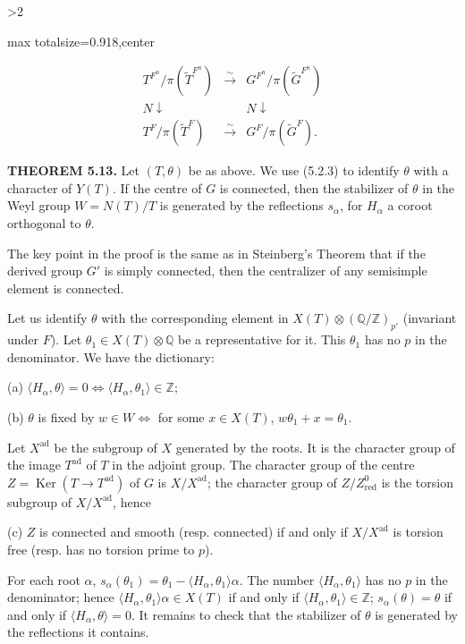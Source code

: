 \documentclass[9pt,twoside]{extarticle}
\newcommand{\EditionPage}[3]{%
  \ifnum#1>2\clearpage\fi
  \pdfbookmark[1]{Printed page #2}{en-folio-#2}%
  \hypertarget{en-physical-#1}{}%
  \noindent\begin{adjustbox}{max totalsize={\textwidth}{0.918\textheight},center}
  \begin{minipage}[t]{\textwidth}
  \fontsize{9.4}{11.1}\selectfont\justifying
  #3
  \end{minipage}
  \end{adjustbox}%
}
\begin{document}
\EditionPage{30}{131}{%
\[
\begin{array}{ccc}
T^{F^n}/\pi(\widetilde T^{F^n})&\xrightarrow{\sim}&G^{F^n}/\pi(\widetilde G^{F^n})\\
{\scriptstyle N}\downarrow&&{\scriptstyle N}\downarrow\\
T^F/\pi(\widetilde T^F)&\xrightarrow{\sim}&G^F/\pi(\widetilde G^F).
\end{array}
\]

\noindent\textbf{THEOREM 5.13.} Let \((T,\theta)\) be as above. We use (5.2.3) to identify \(\theta\) with a character of \(Y(T)\). If the centre of \(G\) is connected, then the stabilizer of \(\theta\) in the Weyl group \(W=N(T)/T\) is generated by the reflections \(s_\alpha\), for \(H_\alpha\) a coroot orthogonal to \(\theta\).\par

The key point in the proof is the same as in Steinberg's Theorem that if the derived group \(G'\) is simply connected, then the centralizer of any semisimple element is connected.\par

Let us identify \(\theta\) with the corresponding element in \(X(T)\otimes(\mathbb Q/\mathbb Z)_{p'}\) (invariant under \(F\)). Let \(\theta_1\in X(T)\otimes\mathbb Q\) be a representative for it. This \(\theta_1\) has no \(p\) in the denominator. We have the dictionary:\par

(a) \(\langle H_\alpha,\theta\rangle=0\Longleftrightarrow\langle H_\alpha,\theta_1\rangle\in\mathbb Z\);\par

(b) \(\theta\) is fixed by \(w\in W\Longleftrightarrow\) for some \(x\in X(T)\), \(w\theta_1+x=\theta_1\).\par

Let \(X^{\mathrm{ad}}\) be the subgroup of \(X\) generated by the roots. It is the character group of the image \(T^{\mathrm{ad}}\) of \(T\) in the adjoint group. The character group of the centre \(Z=\operatorname{Ker}(T\to T^{\mathrm{ad}})\) of \(G\) is \(X/X^{\mathrm{ad}}\); the character group of \(Z/Z_{\mathrm{red}}^0\) is the torsion subgroup of \(X/X^{\mathrm{ad}}\), hence\par

(c) \(Z\) is connected and smooth (resp. connected) if and only if \(X/X^{\mathrm{ad}}\) is torsion free (resp. has no torsion prime to \(p\)).\par

For each root \(\alpha\), \(s_\alpha(\theta_1)=\theta_1-\langle H_\alpha,\theta_1\rangle\alpha\). The number \(\langle H_\alpha,\theta_1\rangle\) has no \(p\) in the denominator; hence \(\langle H_\alpha,\theta_1\rangle\alpha\in X(T)\) if and only if \(\langle H_\alpha,\theta_1\rangle\in\mathbb Z\); \(s_\alpha(\theta)=\theta\) if and only if \(\langle H_\alpha,\theta\rangle=0\). It remains to check that the stabilizer of \(\theta\) is generated by the reflections it contains.\par

}
\end{document}
